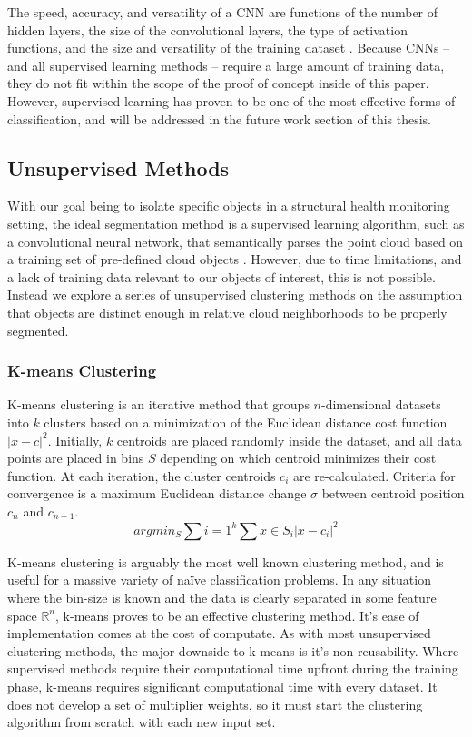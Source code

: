 \documentclass[12pt]{drexelthesis}
\let\Oldsubsection\subsection
\renewcommand{\subsection}{\FloatBarrier\Oldsubsection}
\let\Oldsubsubsection\subsubsection
\renewcommand{\subsubsection}{\FloatBarrier\Oldsubsubsection}
\begin{document}
The speed, accuracy, and versatility of a CNN are functions of the number of hidden layers, the size of the convolutional layers, the type of activation functions, and the size and versatility of the training dataset \cite{RN7}. Because CNNs -- and all supervised learning methods -- require a large amount of training data, they do not fit within the scope of the proof of concept inside of this paper. However, supervised learning has proven to be one of the most effective forms of classification, and will be addressed in the future work section of this thesis.

\subsection{Unsupervised Methods}
With our goal being to isolate specific objects in a structural health monitoring setting, the ideal segmentation method is a supervised learning algorithm, such as a convolutional neural network, that semantically parses the point cloud based on a training set of pre-defined cloud objects \cite{RN72}. However, due to time limitations, and a lack of training data relevant to our objects of interest, this is not possible. Instead we explore a series of unsupervised clustering methods on the assumption that objects are distinct enough in relative cloud neighborhoods to be properly segmented.

\subsubsection{K-means Clustering}
K-means clustering is an iterative method that groups $n$-dimensional datasets into $k$ clusters based on a minimization of the Euclidean distance cost function $|x-c|^{2}$. Initially, $k$ centroids are placed randomly inside the dataset, and all data points are placed in bins $S$ depending on which centroid minimizes their cost function. At each iteration, the cluster centroids $c_{i}$ are re-calculated. Criteria for convergence is a maximum Euclidean distance change $\sigma$ between centroid position $c_{n}$ and $c_{n+1}$.
\begin{equation}
	arg min_{S} \sum{i=1}^{k} \sum{x \in S_{i}} |x - c_{i}|^{2}
\end{equation}

K-means clustering is arguably the most well known clustering method, and is useful for a massive variety of naïve classification problems. In any situation where the bin-size is known and the data is clearly separated in some feature space $\mathbb{R}^{n}$, k-means proves to be an effective clustering method. It's ease of implementation comes at the cost of computate. As with most unsupervised clustering methods, the major downside to k-means is it's non-reusability. Where supervised methods require their computational time upfront during the training phase, k-means requires significant computational time with every dataset. It does not develop a set of multiplier weights, so it must start the clustering algorithm from scratch with each new input set.
\end{document}
